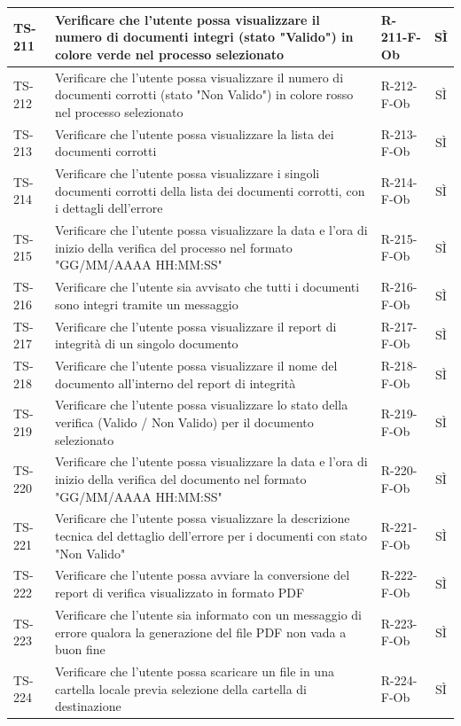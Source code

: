 \documentclass[a4paper,12pt]{article}
\begin{document}
\begin{longtable}{|p{1.5cm}|p{8.3cm}|p{2.4cm}|c|}
\hline
TS-211 & Verificare che l'utente possa visualizzare il numero di documenti integri (stato "Valido") in colore verde nel processo selezionato & R-211-F-Ob & SÌ \\
\hline
TS-212 & Verificare che l'utente possa visualizzare il numero di documenti corrotti (stato "Non Valido") in colore rosso nel processo selezionato & R-212-F-Ob & SÌ \\
\hline
TS-213 & Verificare che l'utente possa visualizzare la lista dei documenti corrotti & R-213-F-Ob & SÌ \\
\hline
TS-214 & Verificare che l'utente possa visualizzare i singoli documenti corrotti della lista dei documenti corrotti, con i dettagli dell'errore & R-214-F-Ob & SÌ \\
\hline
TS-215 & Verificare che l'utente possa visualizzare la data e l'ora di inizio della verifica del processo nel formato "GG/MM/AAAA HH:MM:SS" & R-215-F-Ob & SÌ \\
\hline
TS-216 & Verificare che l'utente sia avvisato che tutti i documenti sono integri tramite un messaggio & R-216-F-Ob & SÌ \\
\hline
TS-217 & Verificare che l'utente possa visualizzare il report di integrità di un singolo documento & R-217-F-Ob & SÌ \\
\hline
TS-218 & Verificare che l'utente possa visualizzare il nome del documento all'interno del report di integrità & R-218-F-Ob & SÌ \\
\hline
TS-219 & Verificare che l'utente possa visualizzare lo stato della verifica (Valido / Non Valido) per il documento selezionato & R-219-F-Ob & SÌ \\
\hline
TS-220 & Verificare che l'utente possa visualizzare la data e l'ora di inizio della verifica del documento nel formato "GG/MM/AAAA HH:MM:SS" & R-220-F-Ob & SÌ \\
\hline
TS-221 & Verificare che l'utente possa visualizzare la descrizione tecnica del dettaglio dell'errore per i documenti con stato "Non Valido" & R-221-F-Ob & SÌ \\
\hline
TS-222 & Verificare che l'utente possa avviare la conversione del report di verifica visualizzato in formato PDF & R-222-F-Ob & SÌ \\
\hline
TS-223 & Verificare che l'utente sia informato con un messaggio di errore qualora la generazione del file PDF non vada a buon fine & R-223-F-Ob & SÌ \\
\hline
TS-224 & Verificare che l'utente possa scaricare un file in una cartella locale previa selezione della cartella di destinazione & R-224-F-Ob & SÌ \\

\end{longtable}
\end{document}
